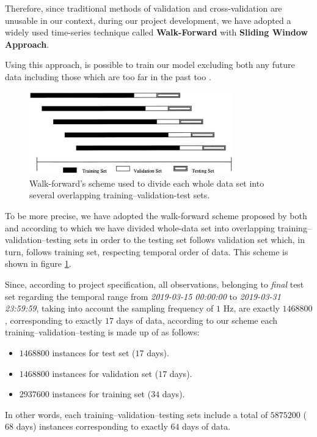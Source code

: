\documentclass[sigconf]{acmart}
\begin{document}
Therefore, since traditional methods of validation and cross-vali\-da\-tion are unusable in our context, during our project development, we have adopted a widely used time-series technique called \textbf{Walk-Forward} with \textbf{Sliding Window Approach}.

Using this approach, is possible to train our model excluding both any future data including those which are too far in the past too \cite{Falessi}.

\begin{figure}
  
  \includegraphics[width=250pt]{walk.png}
  \caption{Walk-forward's scheme used to divide each whole data set into several overlapping training–validation-test sets.
  \label{figureddd}
}
\end{figure}

To be more precise, we have adopted the walk-forward scheme proposed by both \citet{WALK1} and \citet{WALK2} according to which we have divided  whole-data set into overlapping training–validation–testing sets in order to the testing set follows validation set which, in turn, follows training set, respecting temporal order of data. This scheme is shown in figure \ref{figureddd}.

Since, according to project specification, all observations, belonging to \textit{final} test set regarding the temporal range from \textit{2019-03-15 00:00:00} to \textit{2019-03-31 23:59:59}, taking into account the sampling frequency of $1$ Hz, are exactly $1468800$, corresponding to exactly $17$ days of data, according to our scheme each training–validation–testing is made up of as follows:
\begin{itemize}
\item $1468800$ instances for test set ($17$ days).
\item $1468800$ instances for validation set ($17$ days).
\item $2937600$ instances for training set ($34$ days).
\end{itemize}

In other words, each training–validation–testing sets include a total of $5875200$ ($68$ days) instances corresponding to exactly $64$ days of data. 
\end{document}

